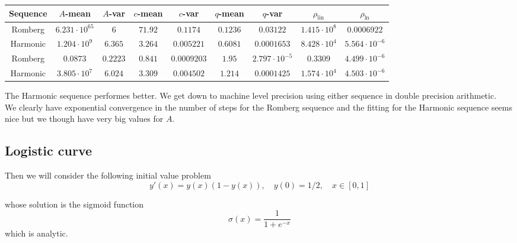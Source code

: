 \begin{table}[H]
    \centering
    \small
    \begin{tabular}{c||c|c|c|c|c|c|c|c}
Sequence & \(A\)-mean & \(A\)-var & \(c\)-mean & \(c\)-var & \(q\)-mean & \(q\)-var & \(\rho_{\operatorname{lin}}\) & \(\rho_{\ln}\)\\\hline
\rowcolor{red}
Romberg & \(6.231\cdot 10^{65}\) & \(6\) & \(71.92\) & \(0.1174\) & \(0.1236\) & \(0.03122\) & \(1.415\cdot 10^8\) & \(0.0006922\) \\
\rowcolor{yellow}
Harmonic & \(1.204\cdot 10^9\) & \(6.365\) & \(3.264\) & \(0.005221\) & \(0.6081\) & \(0.0001653\) & \(8.428\cdot 10^4\) & \(5.564\cdot 10^{-6}\) \\
\rowcolor{green}
Romberg & \(0.0873\) & \(0.2223\) & \(0.841\) & \(0.0009203\) & \(1.95\) & \(2.797\cdot 10^{-5}\) & \(0.3309\) & \(4.499\cdot 10^{-6}\) \\
\rowcolor{yellow}
Harmonic & \(3.805\cdot 10^7\) & \(6.024\) & \(3.309\) & \(0.004502\) & \(1.214\) & \(0.0001425\) & \(1.574\cdot 10^4\) & \(4.503\cdot 10^{-6}\) \\
    \end{tabular}
    \label{tab:my_label}
\end{table}

The Harmonic sequence performes better. We get down to machine level precision using either sequence in double precision arithmetic.\\

We clearly have exponential convergence in the number of steps for the Romberg sequence and the fitting for the Harmonic sequence seems nice but we though have very big values for \(A\).

\subsection{Logistic curve}

Then we will consider the following initial value problem
\begin{equation}\label{43}
y'(x) = y(x)(1-y(x)),\quad y(0) = 1/2, \quad x\in [0,1]
\end{equation}

whose solution is the sigmoid function
\[
\sigma(x) = \frac{1}{1 + e^{-x}}
\]
which is analytic.

